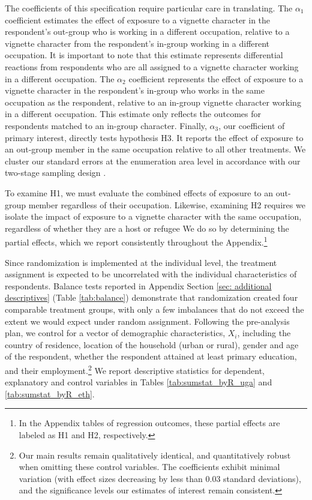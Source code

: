 \documentclass[a4paper,12pt]{article}
\begin{document}
The coefficients of this specification require particular care in translating.  The $\alpha_{1}$ coefficient estimates the effect of exposure to a vignette character in the respondent's out-group who is working in a different occupation, relative to a vignette character from the respondent's in-group working in a different occupation. It is important to note that this estimate represents differential reactions from respondents who are all assigned to a vignette character working in a different occupation. The $\alpha_{2}$ coefficient represents the effect of exposure to a vignette character in the respondent's in-group who works in the same occupation as the respondent, relative to an in-group vignette character working in a different occupation. This estimate only reflects the outcomes for respondents matched to an in-group character. Finally, $\alpha_{3}$, our coefficient of primary interest, directly tests hypothesis H3.  It reports the effect of exposure to an out-group member in the same occupation relative to all other treatments. We cluster our standard errors at the enumeration area level in accordance with our two-stage sampling design \citep{abadie2017should}. 

To examine H1, we must evaluate the combined effects of exposure to an out-group member regardless of their occupation. Likewise, examining H2 requires we isolate the impact of exposure to a vignette character with the same occupation, regardless of whether they are a host or refugee We do so by determining the partial effects, which we report consistently throughout the Appendix.\footnote{In the Appendix tables of regression outcomes, these partial effects are labeled as H1 and H2, respectively.}

Since randomization is implemented at the individual level, the treatment assignment is expected to be uncorrelated with the individual characteristics of respondents. Balance tests reported in Appendix Section \ref{sec: additional descriptives} (Table \ref{tab:balance}) demonstrate that randomization created four comparable treatment groups, with only a few imbalances that do not exceed the extent we would expect under random assignment. Following the pre-analysis plan, we control for a vector of demographic characteristics, $X_{i}$, including the country of residence, location of the household (urban or rural), gender and age of the respondent, whether the respondent attained at least primary education, and their employment.\footnote{Our main results remain qualitatively identical, and quantitatively robust when omitting these control variables. The coefficients exhibit minimal variation (with effect sizes decreasing by less than 0.03 standard deviations), and the significance levels our estimates of interest remain consistent.}
We report descriptive statistics for dependent, explanatory and control variables in Tables \ref{tab:sumstat_byR_uga} and \ref{tab:sumstat_byR_eth}. 
\end{document}
